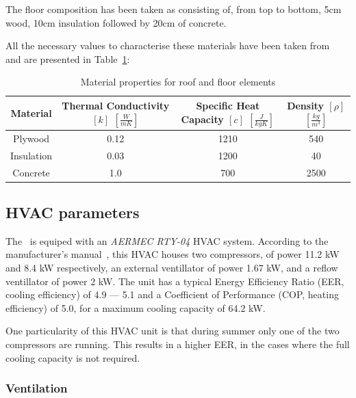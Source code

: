 
The floor composition has been taken as consisting of, from top to bottom, 5cm
wood, 10cm insulation followed by 20cm of concrete. 

All the necessary values to characterise these materials have been taken
from~\cite{BuildingsHeatTransferData} and are presented in
Table~\ref{tab:material_properties}: 

\begin{table}[ht]
\centering
    \begin{tabular}{||c c c c||}
        \hline
        Material & Thermal Conductivity $[k]$ $[\frac{W}{mK}]$ & Specific Heat
        Capacity $[c]$ $[\frac{J}{kgK}]$ & Density $[\rho]$ $[\frac{kg}{m^3}]$
        \\
        \hline \hline
        Plywood & 0.12 & 1210 & 540 \\
        Insulation & 0.03 & 1200 & 40 \\
        Concrete & 1.0 & 700 & 2500 \\
        \hline
    \end{tabular}
    \caption{Material properties for roof and floor elements}
\label{tab:material_properties}
\end{table}

\subsection{HVAC parameters}\label{sec:HVAC_parameters}

The \pdome\ is equiped with an \textit{AERMEC RTY-04} HVAC system. According to
the manufacturer's manual~\cite{aermecRoofTopManuelSelection}, this HVAC houses
two compressors, of power 11.2 kW and 8.4 kW respectively, an external
ventillator of power 1.67 kW, and a reflow ventillator of power 2 kW. The unit
has a typical Energy Efficiency Ratio (EER, cooling efficiency) of 4.9 --- 5.1
and a Coefficient of Performance (COP, heating efficiency) of 5.0, for a maximum
cooling capacity of 64.2 kW. 

One particularity of this HVAC unit is that during summer only one of the two
compressors are running. This results in a higher EER, in the cases where the
full cooling capacity is not required.

\subsubsection*{Ventilation}

